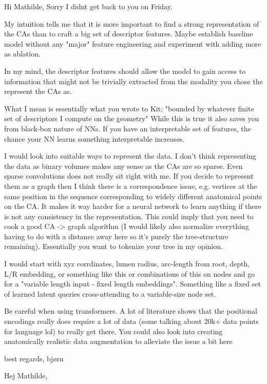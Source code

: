 Hi Mathilde, 
Sorry I didnt get back to you on Friday. 

My intuition tells me that it is more important to find a strong representation of the CAs than to craft a big set of descriptor features. Maybe establish baseline model without any "major" feature engineering and experiment with adding more as ablation.

In my mind, the descriptor features should allow the model to gain access to information that might not be trivially extracted from the modality you chose the represent the CAs as. 

What I mean is essentially what you wrote to Kit; "bounded by whatever finite set of descriptors I compute on the geometry" 
While this is true it also saves you from black-box nature of NNs. If you have an interpretable set of features, the chance your NN learns something interpretable increases. 

I would look into suitable ways to represent the data. I don't think representing the data as binary volumes makes any sense as the CAs are so sparse. Even sparse convolutions does not really sit right with me. 
If you decide to represent them as a graph then I think there is a correspondence issue, e.g. vertices at the same position in the sequence corresponding to widely different anatomical points on the CA. It makes it way harder for a neural network to learn anything if there is not any consistency in the representation. This could imply that you need to cook a good CA -> graph algorithm (I would likely also normalize everything having to do with a distance away here so it's purely the tree-structure remaining). Essentially you want to tokenize your tree in my opinion.

I would start with xyz corrdinates, lumen radius, arc-length from root, depth, L/R embedding, or something like this or combinations of this on nodes and go for a "variable length input - fixed length embeddings". Something like a fixed set of learned latent queries cross-attending to a variable-size node set. 

Be careful when using transformers. A lot of literature shows that the positional encodings really does require a lot of data (some talking about 20k+ data points for language lol) to really get there. You could also look into creating anatomically realistic data augmentation to alleviate the issue a bit here 

best regards,
bjørn

Hej Mathilde, 

